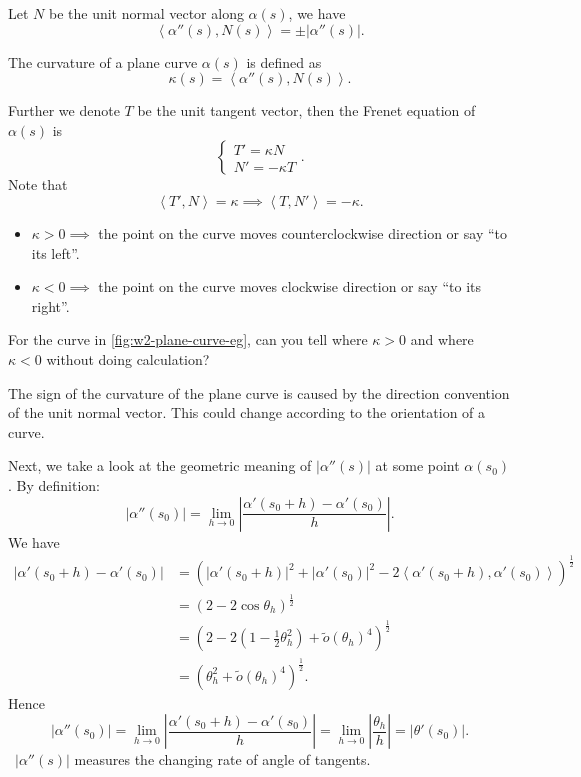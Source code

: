 Let \(N\) be the unit normal vector along \(\alpha(s)\), we have \[
    \left<\alpha''(s),N(s)\right> =\pm|\alpha''(s)|
.\] 
\begin{definition}
    The curvature of a plane curve \(\alpha(s)\) is defined as \[
        \kappa(s)=\left<\alpha''(s),N(s)\right>
    .\] 
\end{definition}
\begin{definition}
    Further we denote \(T\) be the unit tangent vector, then the Frenet equation
    of \(\alpha(s)\) is \[
        \begin{cases}
            T'=\kappa N \\
            N'=-\kappa T
        \end{cases}
    .\] Note that \[
        \left<T',N\right> =\kappa\implies \left<T,N'\right> =-\kappa
    .\] 
\end{definition}

\begin{itemize}
    \item \(\kappa>0\implies \) the point on the curve moves counterclockwise
        direction or say ``to its left''.
    \item \(\kappa<0\implies \) the point on the curve moves clockwise direction
        or say ``to its right''.
\end{itemize}

\begin{question}
    For the curve in \cref{fig:w2-plane-curve-eg}, can you tell where \(\kappa>0\)
    and where \(\kappa<0\) without doing calculation?
\end{question}

\begin{remark}
    The sign of the curvature of the plane curve is caused by the direction
    convention of the unit normal vector. This could change according to the
    orientation of a curve.
\end{remark}

Next, we take a look at the geometric meaning of \(|\alpha''(s)|\) at some point
\(\alpha(s_0)\). By definition: \[
    |\alpha''(s_0)|=\lim_{h \to 0} \left|\frac{\alpha'(s_0+h)-\alpha'(s_0)}{h}\right|
.\] 
We have
\begin{align*}
    |\alpha'(s_0+h)-\alpha'(s_0)|
    &= \left(|\alpha'(s_0+h)|^2+|\alpha'(s_0)|^2-2\left<\alpha'(s_0+h),
    \alpha'(s_0)\right> \right)^{\frac{1}{2}} \\
    &= (2-2\cos\theta_h)^{\frac{1}{2}} \\
    &= (2-2(1-\frac{1}{2}\theta_h^2)+\tilde{o}(\theta_h)^4)^{\frac{1}{2}} \\
    &= (\theta_h^2+\tilde{o}(\theta_h)^4)^{\frac{1}{2}}
.\end{align*}
Hence \[
    |\alpha''(s_0)|=\lim_{h \to 0} \left|\frac{\alpha'(s_0+h)-\alpha'(s_0)}{h}\right|
    =\lim_{h \to 0} \left|\frac{\theta_h}{h}\right|=|\theta'(s_0)|
.\] \ie\ \(|\alpha''(s)|\) measures the changing rate of angle of tangents.

